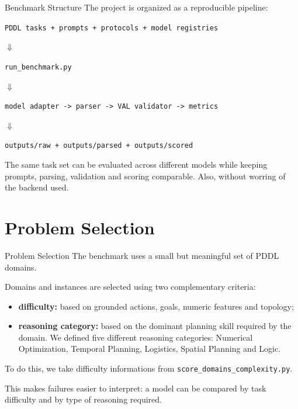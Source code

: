 \documentclass{beamer}
\begin{document}
\begin{frame}{Benchmark Structure}\footnotesize
    The project is organized as a reproducible pipeline:

    \vspace{0.25cm}
    \centering
    \texttt{PDDL tasks + prompts + protocols + model registries}

    \vspace{0.18cm}
    $\Downarrow$

    \vspace{0.18cm}
    \texttt{run\_benchmark.py}

    \vspace{0.18cm}
    $\Downarrow$

    \vspace{0.18cm}
    \texttt{model adapter -> parser -> VAL validator -> metrics}

    \vspace{0.18cm}
    $\Downarrow$

    \vspace{0.18cm}
    \texttt{outputs/raw + outputs/parsed + outputs/scored}

    \vspace{0.35cm}
    \raggedright
    The same task set can be evaluated across different models while keeping prompts, parsing, validation and scoring comparable.
    Also, without worring of the backend used.
\end{frame}

\section{Problem Selection}

\begin{frame}{Problem Selection}\footnotesize
    The benchmark uses a small but meaningful set of PDDL domains.

    \vspace{0.3cm}
    Domains and instances are selected using two complementary criteria:
    \begin{itemize}
        \item \textbf{difficulty:} based on grounded actions, goals, numeric features and topology;
        \item \textbf{reasoning category:} based on the dominant planning skill required by the domain. We defined five different reasoning categories: Numerical Optimization, Temporal Planning, Logistics, Spatial Planning and Logic.
    \end{itemize}

    \vspace{0.3cm}
    To do this, we take difficulty informations from \texttt{score\_domains\_complexity.py}.

    This makes failures easier to interpret: a model can be compared by task difficulty and by type of reasoning required.
\end{frame}
\end{document}
